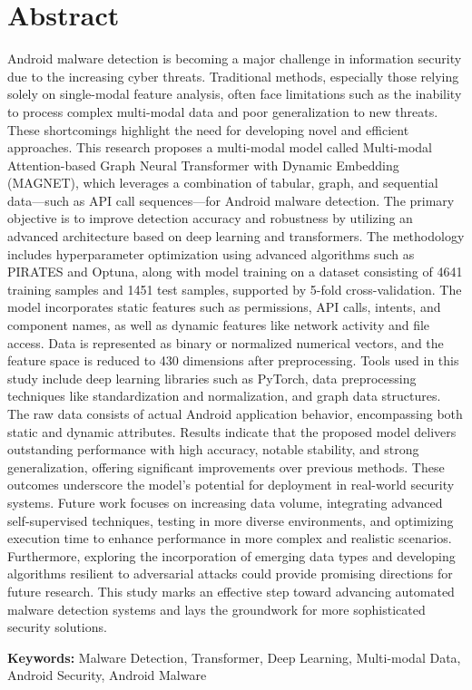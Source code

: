 \chapter*{\vspace{-3cm}\fontsize{14}{15}\selectfont Abstract}
\thispagestyle{empty}
\vspace{-1.5cm}\setlength{\parindent}{20pt}\fontsize{12}{13}\selectfont
Android malware detection is becoming a major challenge in information security due to the increasing cyber threats. Traditional methods, especially those relying solely on single-modal feature analysis, often face limitations such as the inability to process complex multi-modal data and poor generalization to new threats. These shortcomings highlight the need for developing novel and efficient approaches. This research proposes a multi-modal model called Multi-modal Attention-based Graph Neural Transformer with Dynamic Embedding (MAGNET), which leverages a combination of tabular, graph, and sequential data—such as API call sequences—for Android malware detection. The primary objective is to improve detection accuracy and robustness by utilizing an advanced architecture based on deep learning and transformers. The methodology includes hyperparameter optimization using advanced algorithms such as PIRATES and Optuna, along with model training on a dataset consisting of 4641 training samples and 1451 test samples, supported by 5-fold cross-validation. The model incorporates static features such as permissions, API calls, intents, and component names, as well as dynamic features like network activity and file access. Data is represented as binary or normalized numerical vectors, and the feature space is reduced to 430 dimensions after preprocessing. Tools used in this study include deep learning libraries such as PyTorch, data preprocessing techniques like standardization and normalization, and graph data structures. The raw data consists of actual Android application behavior, encompassing both static and dynamic attributes. Results indicate that the proposed model delivers outstanding performance with high accuracy, notable stability, and strong generalization, offering significant improvements over previous methods. These outcomes underscore the model’s potential for deployment in real-world security systems. Future work focuses on increasing data volume, integrating advanced self-supervised techniques, testing in more diverse environments, and optimizing execution time to enhance performance in more complex and realistic scenarios. Furthermore, exploring the incorporation of emerging data types and developing algorithms resilient to adversarial attacks could provide promising directions for future research. This study marks an effective step toward advancing automated malware detection systems and lays the groundwork for more sophisticated security solutions.

\par\vspace{.5cm}\setlength{\parindent}{0pt}
\textbf{Keywords:} Malware Detection, Transformer, Deep Learning, Multi-modal Data, Android Security, Android Malware
